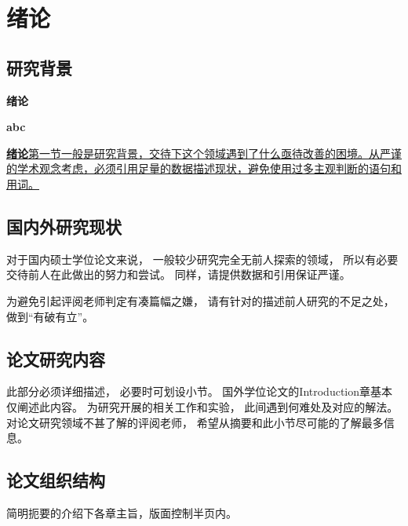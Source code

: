 \chapter{绪论}
\section{研究背景}


\textbf{绪论}

\textbf{abc}

\uline{\textbf{绪论}第一节一般是研究背景，交待下这个领域遇到了什么亟待改善的困境。从严谨的学术观念考虑，必须引用足量的数据描述现状，避免使用过多主观判断的语句和用词。}

\section{国内外研究现状}

对于国内硕士学位论文来说，
一般较少研究完全无前人探索的领域，
所以有必要交待前人在此做出的努力和尝试。
同样，请提供数据和引用保证严谨。

为避免引起评阅老师判定有凑篇幅之嫌，
请有针对的描述前人研究的不足之处，
做到``有破有立''。

\section{论文研究内容}

此部分必须详细描述，
必要时可划设小节。
国外学位论文的Introduction章基本仅阐述此内容。
为研究开展的相关工作和实验，
此间遇到何难处及对应的解法。
对论文研究领域不甚了解的评阅老师，\cite{kanamori1998}
希望从摘要和此小节尽可能的了解最多信息。


\section{论文组织结构}

简明扼要的介绍下各章主旨，版面控制半页内。
